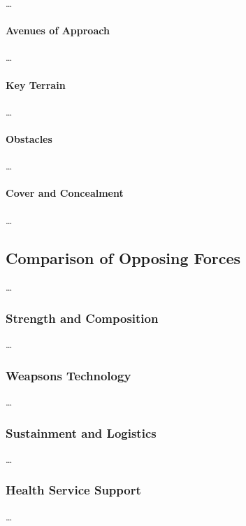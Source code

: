 \ldots

\paragraph{Avenues of Approach}

\ldots

\paragraph{Key Terrain}

\ldots

\paragraph{Obstacles}

\ldots

\paragraph{Cover and Concealment}

\ldots

\subsection{Comparison of Opposing Forces}

\ldots

\subsubsection{Strength and Composition}

\ldots

\subsubsection{Weapsons Technology}

\ldots

\subsubsection{Sustainment and Logistics}

\ldots

\subsubsection{Health Service Support}

\ldots

